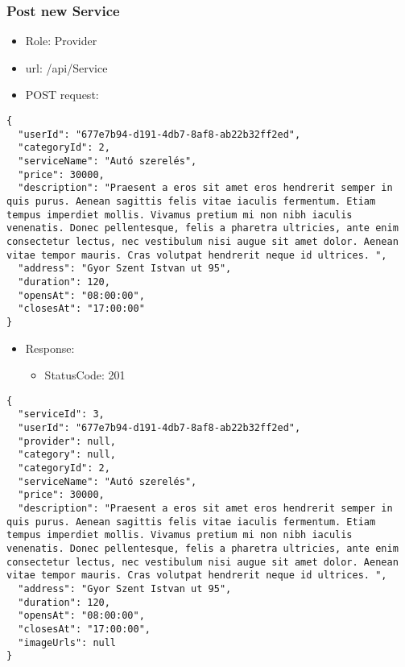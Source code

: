\documentclass[11pt]{article}
\begin{document}
\subsubsection{Post new Service}
\label{sec:org2a00acb}
\begin{itemize}
\item Role: Provider
\item url: /api/Service
\item POST request:
\end{itemize}
\begin{verbatim}
{
  "userId": "677e7b94-d191-4db7-8af8-ab22b32ff2ed",
  "categoryId": 2,
  "serviceName": "Autó szerelés",
  "price": 30000,
  "description": "Praesent a eros sit amet eros hendrerit semper in quis purus. Aenean sagittis felis vitae iaculis fermentum. Etiam tempus imperdiet mollis. Vivamus pretium mi non nibh iaculis venenatis. Donec pellentesque, felis a pharetra ultricies, ante enim consectetur lectus, nec vestibulum nisi augue sit amet dolor. Aenean vitae tempor mauris. Cras volutpat hendrerit neque id ultrices. ",
  "address": "Gyor Szent Istvan ut 95",
  "duration": 120,
  "opensAt": "08:00:00",
  "closesAt": "17:00:00"
}
\end{verbatim}
\begin{itemize}
\item Response:
\begin{itemize}
\item StatusCode: 201
\end{itemize}
\end{itemize}
\begin{verbatim}
{
  "serviceId": 3,
  "userId": "677e7b94-d191-4db7-8af8-ab22b32ff2ed",
  "provider": null,
  "category": null,
  "categoryId": 2,
  "serviceName": "Autó szerelés",
  "price": 30000,
  "description": "Praesent a eros sit amet eros hendrerit semper in quis purus. Aenean sagittis felis vitae iaculis fermentum. Etiam tempus imperdiet mollis. Vivamus pretium mi non nibh iaculis venenatis. Donec pellentesque, felis a pharetra ultricies, ante enim consectetur lectus, nec vestibulum nisi augue sit amet dolor. Aenean vitae tempor mauris. Cras volutpat hendrerit neque id ultrices. ",
  "address": "Gyor Szent Istvan ut 95",
  "duration": 120,
  "opensAt": "08:00:00",
  "closesAt": "17:00:00",
  "imageUrls": null
}
\end{verbatim}
\end{document}
